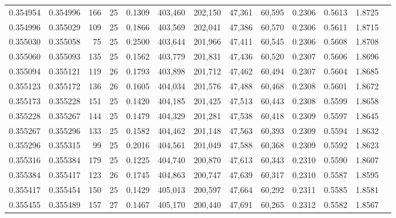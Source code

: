 \begin{tabular}{rrrrrrrrrrrrr}
0.354954 & 0.354996 &   166 &  25 &                                     0.1309 & 403,460 & 202,150 &  47,361 &  60,595 & 0.2306 & 0.5613 & 1.8725 \\
0.354996 & 0.355029 &   109 &  25 &                                     0.1866 & 403,569 & 202,041 &  47,386 &  60,570 & 0.2306 & 0.5611 & 1.8715 \\
0.355030 & 0.355058 &    75 &  25 &                                     0.2500 & 403,644 & 201,966 &  47,411 &  60,545 & 0.2306 & 0.5608 & 1.8708 \\
0.355060 & 0.355093 &   135 &  25 &                                     0.1562 & 403,779 & 201,831 &  47,436 &  60,520 & 0.2307 & 0.5606 & 1.8696 \\
0.355094 & 0.355121 &   119 &  26 &                                     0.1793 & 403,898 & 201,712 &  47,462 &  60,494 & 0.2307 & 0.5604 & 1.8685 \\
0.355123 & 0.355172 &   136 &  26 &                                     0.1605 & 404,034 & 201,576 &  47,488 &  60,468 & 0.2308 & 0.5601 & 1.8672 \\
0.355173 & 0.355228 &   151 &  25 &                                     0.1420 & 404,185 & 201,425 &  47,513 &  60,443 & 0.2308 & 0.5599 & 1.8658 \\
0.355228 & 0.355267 &   144 &  25 &                                     0.1479 & 404,329 & 201,281 &  47,538 &  60,418 & 0.2309 & 0.5597 & 1.8645 \\
0.355267 & 0.355296 &   133 &  25 &                                     0.1582 & 404,462 & 201,148 &  47,563 &  60,393 & 0.2309 & 0.5594 & 1.8632 \\
0.355296 & 0.355315 &    99 &  25 &                                     0.2016 & 404,561 & 201,049 &  47,588 &  60,368 & 0.2309 & 0.5592 & 1.8623 \\
0.355316 & 0.355384 &   179 &  25 &                                     0.1225 & 404,740 & 200,870 &  47,613 &  60,343 & 0.2310 & 0.5590 & 1.8607 \\
0.355384 & 0.355417 &   123 &  26 &                                     0.1745 & 404,863 & 200,747 &  47,639 &  60,317 & 0.2310 & 0.5587 & 1.8595 \\
0.355417 & 0.355454 &   150 &  25 &                                     0.1429 & 405,013 & 200,597 &  47,664 &  60,292 & 0.2311 & 0.5585 & 1.8581 \\
0.355455 & 0.355489 &   157 &  27 &                                     0.1467 & 405,170 & 200,440 &  47,691 &  60,265 & 0.2312 & 0.5582 & 1.8567 \\

\end{tabular}
